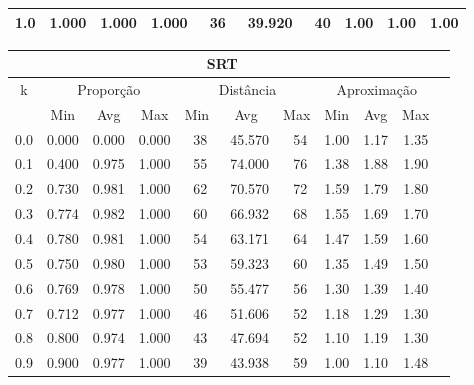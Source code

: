\begin{table}[!tbh]
\begin{center}
{\begin{tabular}{|c|c|c|c|c|c|c|c|c|c|}
1.0                & 1.000     & 1.000    & 1.000    & ~36      & ~39.920  & ~40     & 1.00    & 1.00   & 1.00            \\ \hline
\end{tabular}%
\vspace{5pt}
\begin{tabular}{|c|c|c|c|c|c|c|c|c|c|c|}
\hline
\multicolumn{10}{|c|}{\bf SRT}                                                                                            \\ \hline
\multirow{2}{*}{k} & \multicolumn{3}{c|}{Proporção}  & \multicolumn{3}{c|}{Distância} & \multicolumn{3}{c|}{Aproximação}  \\ \cline{2-10}
                   & Min       & Avg      & Max      & Min      & Avg      & Max     & Min     & Avg    & Max             \\ \hline
0.0                & 0.000     & 0.000    & 0.000    & ~38      & ~45.570  & ~54     & 1.00    & 1.17   & 1.35            \\ \hline
0.1                & 0.400     & 0.975    & 1.000    & ~55      & ~74.000  & ~76     & 1.38    & 1.88   & 1.90            \\ \hline
0.2                & 0.730     & 0.981    & 1.000    & ~62      & ~70.570  & ~72     & 1.59    & 1.79   & 1.80            \\ \hline
0.3                & 0.774     & 0.982    & 1.000    & ~60      & ~66.932  & ~68     & 1.55    & 1.69   & 1.70            \\ \hline
0.4                & 0.780     & 0.981    & 1.000    & ~54      & ~63.171  & ~64     & 1.47    & 1.59   & 1.60            \\ \hline
0.5                & 0.750     & 0.980    & 1.000    & ~53      & ~59.323  & ~60     & 1.35    & 1.49   & 1.50            \\ \hline
0.6                & 0.769     & 0.978    & 1.000    & ~50      & ~55.477  & ~56     & 1.30    & 1.39   & 1.40            \\ \hline
0.7                & 0.712     & 0.977    & 1.000    & ~46      & ~51.606  & ~52     & 1.18    & 1.29   & 1.30            \\ \hline
0.8                & 0.800     & 0.974    & 1.000    & ~43      & ~47.694  & ~52     & 1.10    & 1.19   & 1.30            \\ \hline
0.9                & 0.900     & 0.977    & 1.000    & ~39      & ~43.938  & ~59     & 1.00    & 1.10   & 1.48            \\ \hline

\end{tabular}}
\end{center}
\end{table}
